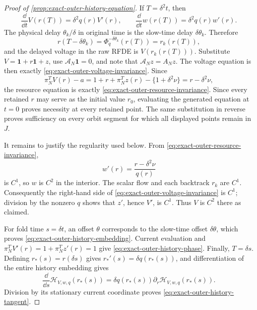 \begin{proof}[Proof of \cref{prop:exact-outer-history-equation}]
If \(T=\delta^2t\), then
\[
 \frac{\dd}{\dd t}V(r(T))
 =\delta^2q(r)V'(r),\qquad
 \frac{\dd}{\dd t}w(r(T))
 =\delta^2q(r)w'(r).
\]
The physical delay \(\theta_k/\delta\) in original time is the slow-time
delay \(\delta\theta_k\).  Therefore
\[
 r\!\left(T-\delta\theta_k\right)
 =\Phi_q^{-\delta\theta_k}(r(T))=r_k(r(T)),
\]
and the delayed voltage in the raw RFDE is \(V(r_k(r(T)))\).  Substitute
\(V=\mathbf1+r\mathbf1+z\), use
\(\mathcal A_N\mathbf1=0\), and note that
\(\mathcal A_Nz=A_Nz\).  The voltage equation is then exactly
\cref{eq:exact-outer-voltage-invariance}.  Since
\[
 \pi_N^TV(r)-a
 =1+r+\pi_N^Tz(r)-\{1+\delta^2\nu\}
 =r-\delta^2\nu,
\]
the resource equation is exactly
\cref{eq:exact-outer-resource-invariance}.  Since every retained \(r\) may
serve as the initial value \(r_0\), evaluating the generated equation at
\(t=0\) proves necessity at every retained point.  The same substitution in
reverse proves sufficiency on every orbit segment for which all displayed
points remain in \(J\).

It remains to justify the regularity used below.  From
\cref{eq:exact-outer-resource-invariance},
\[
 w'(r)=\frac{r-\delta^2\nu}{q(r)}
\]
is \(C^1\), so \(w\) is \(C^2\) in the interior.  The scalar flow and each
backtrack \(r_k\) are \(C^1\).  Consequently the right-hand side of
\cref{eq:exact-outer-voltage-invariance} is \(C^1\); division by the nonzero
\(q\) shows that \(z'\), hence \(V'\), is \(C^1\).  Thus \(V\) is \(C^2\)
there as claimed.

For fold time \(s=\delta t\), an offset \(\theta\) corresponds to the
slow-time offset \(\delta\theta\), which proves
\cref{eq:exact-outer-history-embedding}.  Current evaluation and
\(\pi_N^TV'(r)=1+\pi_N^Tz'(r)=1\) give
\cref{eq:exact-outer-history-phase}.  Finally,
\(T=\delta s\).  Defining \(r_*(s)=r(\delta s)\) gives
\(r_*'(s)=\delta q(r_*(s))\), and differentiation of the entire history
embedding gives
\[
 \frac{\dd}{\dd s}\mathcal H_{V,w,q}(r_*(s))
 =\delta q(r_*(s))\partial_r\mathcal H_{V,w,q}(r_*(s)).
\]
Division by its stationary current coordinate proves
\cref{eq:exact-outer-history-tangent}.
\end{proof}

